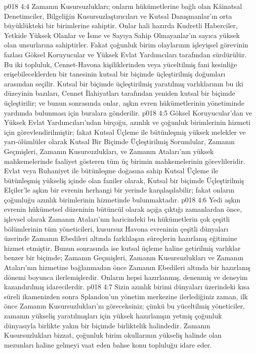 \vs p018 4:4 Zamanın Kusursuzlukları; onların hükümetlerine bağlı olan Kâinatsal Denetimciler, Bilgeliğin Kusursuzlaştırıcıları ve Kutsal Danışmanlar’ın orta büyüklükteki bir birimlerine sahiptir. Onlar hali hazırda Kudretli Haberciler, Yetkide Yüksek Olanlar ve İsme ve Sayıya Sahip Olmayanlar’ın sayıca yüksek olan unsurlarına sahiptirler. Fakat çoğunluk birim olaylarının işleyişsel görevinin fazlası Göksel Koruyucular ve Yüksek Evlat Yardımcıları tarafından sürdürülür. Bu iki topluluk, Cennet\hyp{}Havona kişiliklerinden veya yüceltilmiş fani kesinliğe erişebileceklerden bir tanesinin kutsal bir biçimde üçleştirilmiş doğumları arasından seçilir. Kutsal bir biçimde üçleştirilmiş yaratılmış varlıklarının bu iki düzeyinin bazıları, Cennet İlahiyatları tarafından yeniden kutsal bir biçimde üçleştirilir; ve bunun sonrasında onlar, aşkın evren hükümetlerinin yönetiminde yardımda bulunması için buralara gönderilir.
\vs p018 4:5 Göksel Koruyucular’dan ve Yüksek Evlat Yardımcıları’ndan birçoğu, azınlık ve çoğunluk birimlerinin hizmeti için görevlendirilmiştir; fakat Kutsal Üçleme ile bütünleşmiş yüksek melekler ve yarı\hyp{}ölümlüler olarak Kutsal Bir Biçimde Üçleştirilmiş Sorumlular, Zamanın Geçmişleri, Zamanın Kusursuzlukları, ve Zamanın Ataları’nın yüksek mahkemelerinde faaliyet gösteren tüm üç birimin mahkemelerinin görevlileridir. Evlat veya Ruhaniyet ile bütünleşme doğasına sahip Kutsal Üçleme ile bütünleşmiş yükseliş içinde olan faniler olarak, Kutsal bir biçimde Üçleştirilmiş Elçiler’le aşkın bir evrenin herhangi bir yerinde karşılaşılabilir; fakat onların çoğunluğu azınlık birimlerinin hizmetinde bulunmaktadır.
\vs p018 4:6 Yedi aşkın evrenin hükümetsel düzeninin bütüncül olarak açığa çıktığı zamanlardan önce, işlevsel olarak Zamanın Ataları’nın haricindeki bu hükümetlerin çok çeşitli bölümlerinin tüm yöneticileri, kusursuz Havona evreninin çeşitli dünyaları üzerinde Zamanın Ebedileri altında farklılaşan süreçlerin hazırlanış eğitimine hizmet etmiştir. Bunun sonrasında ise kutsal üçleme haline getirilmiş varlıklar benzer bir biçimde; Zamanın Geçmişleri, Zamanın Kusursuzlukları ve Zamanın Ataları’nın hizmetine bağlanmadan önce Zamanın Ebedileri altında bir hazırlanış dönemi boyunca ilerlemişlerdir. Onların hepsi hazırlanmış, denenmiş ve deneyim kazandırılmış idarecilerdir.
\vs p018 4:7 Sizin azınlık birimi dünyaları üzerindeki kısa süreli ikamenizden sonra Splandon’un yönetim merkezine ilerlediğiniz zaman, ilk önce Zamanın Kusursuzlukları’nı göreceksiniz; çünkü bu yüceltilmiş yöneticiler, zamanın yükseliş yaratılmışları için yüksek hazırlanışın yetmiş çoğunluk dünyasıyla birlikte yakın bir biçimde birliktelik halindedir. Zamanın Kusursuzlukları bizzat, çoğunluk birim okullarının yükseliş halinde olan mezunları haline gelmeyi vaat eden bahse konu topluluğu idare eder.
